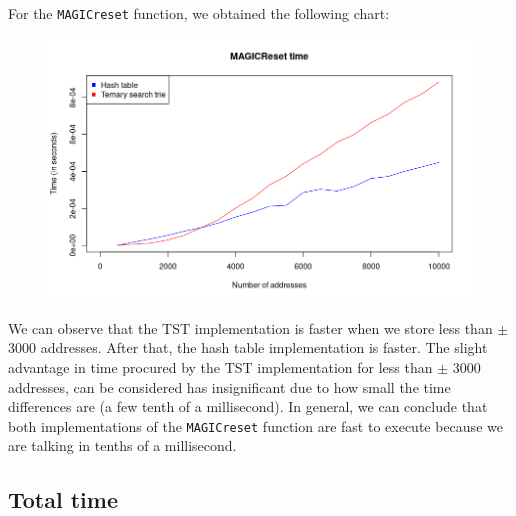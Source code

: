\documentclass[a4paper, 11pt, oneside]{article}
\begin{document}
\paragraph{}For the \texttt{MAGICreset} function, we obtained the following chart:
\begin{figure}[H]
  \centering
  \includegraphics[scale=.5]{plots/reset.png}
\end{figure}
We can observe that the TST implementation is faster when we store less than $\pm$ 3000 addresses. After that, the hash table implementation is faster. The slight advantage in time procured by the TST implementation for less than $\pm$ 3000 addresses, can be considered has insignificant due to how small the time differences are (a few tenth of a millisecond). In general, we can conclude that both implementations of the \texttt{MAGICreset} function are fast to execute because we are talking in tenths of a millisecond.

\subsection{Total time}
\end{document}
